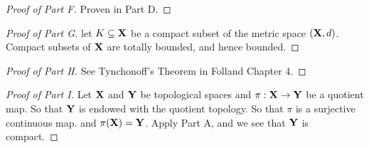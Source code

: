\documentclass[../main-manifolds.tex]{subfiles}
\begin{document}
\begin{proof}[Proof of  Part F]
    Proven in Part D.
\end{proof}
    
\begin{proof}[Proof of  Part G]
    let $K\subseteq {\mathbf{X}}$ be a compact subset of the metric space $({\mathbf{X}},d)$. Compact subsets of ${\mathbf{X}}$ are totally bounded, and hence bounded.
\end{proof}

\begin{proof}[Proof of  Part H]
    See Tynchonoff's Theorem in Folland Chapter 4.
\end{proof}

\begin{proof}[Proof of  Part I]
    Let ${\mathbf{X}}$ and ${\mathbf{Y}}$ be topological spaces and $\pi: {\mathbf{X}}\to{\mathbf{Y}}$ be a quotient map. So that ${\mathbf{Y}}$ is endowed with the quotient topology. So that $\pi$ is a surjective continuous map. and $\pi({\mathbf{X}})={\mathbf{Y}}$. Apply Part A, and we see that ${\mathbf{Y}}$ is compact.
\end{proof}
\end{document}
